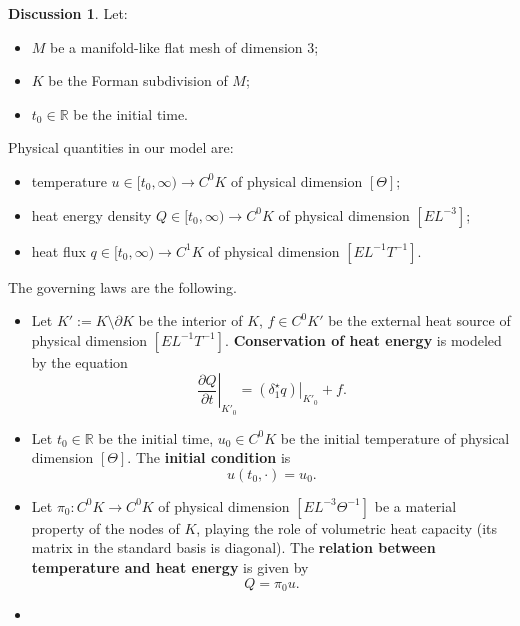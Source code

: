 \documentclass[fleqn]{article}
\theoremstyle{definition}
\newtheorem{discussion}[theorem]{Discussion}
\newcommand{\R}{\mathbb{R}}
\newcommand{\restrict}[2]{\left. #1 \right|_{#2}}
\begin{document}
\begin{discussion}
  Let:
  \begin{itemize}
    \item $M$ be a manifold-like flat mesh of dimension $3$;
    \item $K$ be the Forman subdivision of $M$;
    \item $t_0 \in \R$ be the initial time.
  \end{itemize}
  Physical quantities in our model are:
  \begin{itemize}
    \item
      temperature $u \in [t_0, \infty) \to C^0 K$ of physical dimension
      $[\Theta]$;
    \item
      heat energy density $Q \in [t_0, \infty) \to C^0 K$ of physical dimension
      $[E L^{-3}]$;
    \item
      heat flux $q \in [t_0, \infty) \to C^1 K$ of physical dimension
      $[E L^{-1} T^{-1}]$.
  \end{itemize}
  The governing laws are the following.
  \begin{itemize}
    \item
      Let
        $K' := K \setminus \partial K$ be the interior of $K$,
        $f \in C^0 K'$ be the external heat source of physical dimension
          $[E L^{-1} T^{-1}]$.
      \textbf{Conservation of heat energy} is modeled by the equation
      \begin{equation}
        \restrict{\frac{\partial Q}{\partial t}}{K'_0} =
        \restrict{(\delta_1^\star q)}{K'_0} + f.
      \end{equation}
    \item
      Let
        $t_0 \in \R$ be the initial time,
        $u_0 \in C^0 K$ be the initial temperature of physical dimension
          $[\Theta]$.
      The \textbf{initial condition} is
      \begin{equation}
        u(t_0, \cdot) = u_0.
      \end{equation}
    \item
      Let $\pi_0 \colon C^0 K \to C^0 K$
      of physical dimension $[E L^{-3} \Theta^{-1}]$
      be a material property of the nodes of $K$,
      playing the role of volumetric heat capacity
      (its matrix in the standard basis is diagonal).
      The \textbf{relation between temperature and heat energy} is given by
      \begin{equation}
        Q = \pi_0 u.
      \end{equation}
    \item

\end{itemize}
\end{discussion}
\end{document}
